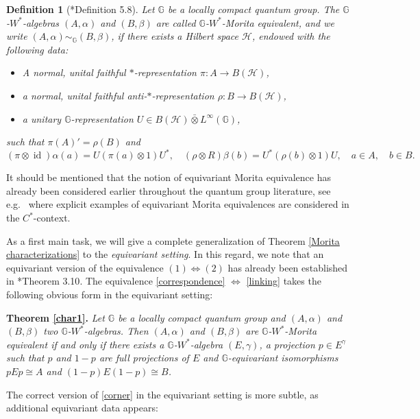 \documentclass[reqno]{amsart}
\numberwithin{equation}{section}
\newtheorem{Def}[Theorem]{Definition}
\DeclareMathOperator{\id}{\mathrm{id}}
\newcommand{\G}{\mathbb{G}}
\newcommand{\ovot}{\bar{\otimes}}
\begin{document}
\begin{Def}[\cite{DCDR24a}*{Definition 5.8}] \label{MoritaClassical} Let $\G$ be a locally compact quantum group.
    The $\G$-$W^*$-algebras $(A, \alpha)$ and $(B, \beta)$ are called $\G$-$W^*$-Morita equivalent, and we write $(A, \alpha)\sim_\G (B, \beta)$, if there exists a Hilbert space $\mathcal{H}$, endowed with the following data:
    \begin{itemize}\setlength\itemsep{-0.5em}
        \item A normal, unital faithful $*$-representation $\pi: A \to B(\mathcal{H})$,
        \item a normal, unital faithful anti-$*$-representation $\rho: B \to B(\mathcal{H})$,
        \item a unitary $\G$-representation $U\in B(\mathcal{H})\ovot L^\infty(\G)$,
        \end{itemize}
        such that $\pi(A)'= \rho(B)$ and
        $$(\pi\otimes \id)\alpha(a) = U(\pi(a)\otimes 1)U^*, \quad (\rho \otimes R)\beta(b) = U^*(\rho(b)\otimes 1)U, \quad a\in A, \quad b\in B.$$
\end{Def}

It should be mentioned that the notion of equivariant Morita equivalence has already been considered earlier throughout the quantum group literature, see e.g.\ \cites{Vae05, DC12} where explicit examples of equivariant Morita equivalences are considered in the $C^*$-context. 

As a first main task, we will give a complete generalization of Theorem \ref{Morita characterizations} to the \emph{equivariant setting}. 
In this regard, we note that an equivariant version of the equivalence $(1) \iff (2)$ has already been established in \cite{DR24b}*{Theorem 3.10}. The equivalence \eqref{correspondence} $\iff$ \eqref{linking} takes the following obvious form in the equivariant setting:

\textbf{Theorem \ref{char1}.} \textit{Let $\G$ be a locally compact quantum group and $(A, \alpha)$ and $(B, \beta)$ two $\G$-$W^*$-algebras. Then $(A, \alpha)$ and $(B, \beta)$ are $\G$-$W^*$-Morita equivalent if and only if there exists a $\G$-$W^*$-algebra $(E, \gamma)$, a projection $p\in E^\gamma$ such that $p$ and $1-p$ are full projections of $E$ and $\G$-equivariant isomorphisms $pEp \cong A$ and $(1-p)E(1-p) \cong B$.}

The correct version of \eqref{corner} in the equivariant setting is more subtle, as additional equivariant data appears:
\end{document}
